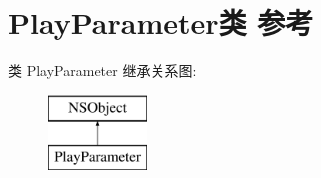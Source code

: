 \hypertarget{interface_play_parameter}{}\section{Play\+Parameter类 参考}
\label{interface_play_parameter}
类 Play\+Parameter 继承关系图\+:\begin{figure}[H]
\begin{center}
\leavevmode
\includegraphics[height=2.000000cm]{interface_play_parameter}
\end{center}
\end{figure}
